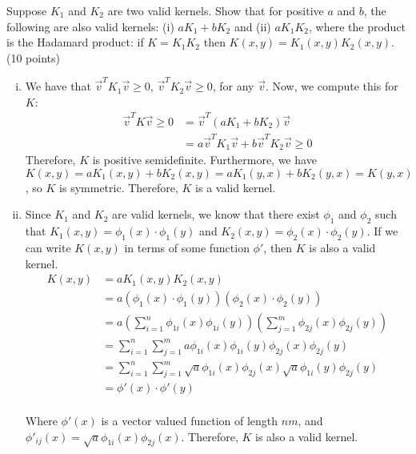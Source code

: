 \documentclass[fleqn]{homework}
\begin{document}
  \maketitle

  \begin{problem}{1}
    \begin{question}
      Suppose $K_1$ and $K_2$ are two valid kernels. Show that for positive $a$
      and $b$, the following are also valid kernels: (i) $aK_1+bK_2$ and (ii)
      $aK_1K_2$, where the product is the Hadamard product: if $K=K_1K_2$ then
      $K(x,y)=K_1(x,y)K_2(x,y)$. (10 points)
    \end{question}

    \begin{enumerate}[(i)]
    \item We have that $\vec{v}^T K_1 \vec{v} \ge 0$,
      $\vec{v}^T K_2 \vec{v} \ge 0$, for any $\vec{v}$.  Now, we compute this
      for $K$:
      \begin{align*}
        \vec{v}^T K \vec{v} \ge 0 
        &= \vec{v}^T (aK_1 + bK_2) \vec{v} \\
        &= a \vec{v}^T K_1 \vec{v} + b \vec{v}^T K_2 \vec{v} \ge 0
      \end{align*}
      Therefore, $K$ is positive semidefinite.  Furthermore, we have
      $K(x,y) = aK_1(x,y) + bK_2(x,y) = aK_1(y,x) + bK_2(y,x) = K(y,x)$, so $K$
      is symmetric.  Therefore, $K$ is a valid kernel.

    \item Since $K_1$ and $K_2$ are valid kernels, we know that there exist
      $\phi_1$ and $\phi_2$ such that $K_1(x,y) = \phi_1(x) \cdot \phi_1(y)$ and
      $K_2(x,y) = \phi_2(x) \cdot \phi_2(y)$.  If we can write $K(x,y)$ in terms
      of some function $\phi'$, then $K$ is also a valid kernel.
      \begin{align*}
        K(x,y) &= aK_1(x,y) K_2(x,y) \\
               &= a(\phi_1(x) \cdot \phi_1(y))(\phi_2(x) \cdot \phi_2(y)) \\
               &= a\left(\sum_{i=1}^n \phi_{1i}(x)\phi_{1i}(y)\right) \left(\sum_{j=1}^m \phi_{2j}(x)\phi_{2j}(y)\right)\\
               &= \sum_{i=1}^n \sum_{j=1}^m a\phi_{1i}(x) \phi_{1i}(y) \phi_{2j}(x) \phi_{2j}(y) \\
               &= \sum_{i=1}^n \sum_{j=1}^m \sqrt{a}\phi_{1i}(x) \phi_{2j}(x) \sqrt{a}\phi_{1i}(y) \phi_{2j}(y) \\
               &= \phi'(x) \cdot \phi'(y)\\
      \end{align*}

      Where $\phi'(x)$ is a vector valued function of length $nm$, and
      $\phi'_{ij}(x) = \sqrt{a} \phi_{1i}(x) \phi_{2j}(x)$.  Therefore, $K$ is
      also a valid kernel.
    \end{enumerate}
  \end{problem}
\end{document}
